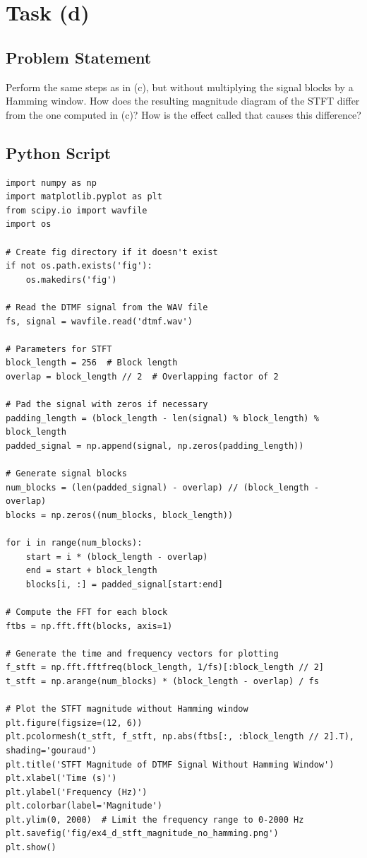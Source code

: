 \item[(d)]
\section*{Task (d)}

\subsection*{Problem Statement}
Perform the same steps as in (c), but without multiplying the signal blocks by a Hamming window. How does the resulting magnitude diagram of the STFT differ from the one computed in (c)? How is the effect called that causes this difference?

\subsection*{Python Script}
\begin{verbatim}
import numpy as np
import matplotlib.pyplot as plt
from scipy.io import wavfile
import os

# Create fig directory if it doesn't exist
if not os.path.exists('fig'):
    os.makedirs('fig')

# Read the DTMF signal from the WAV file
fs, signal = wavfile.read('dtmf.wav')

# Parameters for STFT
block_length = 256  # Block length
overlap = block_length // 2  # Overlapping factor of 2

# Pad the signal with zeros if necessary
padding_length = (block_length - len(signal) % block_length) % block_length
padded_signal = np.append(signal, np.zeros(padding_length))

# Generate signal blocks
num_blocks = (len(padded_signal) - overlap) // (block_length - overlap)
blocks = np.zeros((num_blocks, block_length))

for i in range(num_blocks):
    start = i * (block_length - overlap)
    end = start + block_length
    blocks[i, :] = padded_signal[start:end]

# Compute the FFT for each block
ftbs = np.fft.fft(blocks, axis=1)

# Generate the time and frequency vectors for plotting
f_stft = np.fft.fftfreq(block_length, 1/fs)[:block_length // 2]
t_stft = np.arange(num_blocks) * (block_length - overlap) / fs

# Plot the STFT magnitude without Hamming window
plt.figure(figsize=(12, 6))
plt.pcolormesh(t_stft, f_stft, np.abs(ftbs[:, :block_length // 2].T), shading='gouraud')
plt.title('STFT Magnitude of DTMF Signal Without Hamming Window')
plt.xlabel('Time (s)')
plt.ylabel('Frequency (Hz)')
plt.colorbar(label='Magnitude')
plt.ylim(0, 2000)  # Limit the frequency range to 0-2000 Hz
plt.savefig('fig/ex4_d_stft_magnitude_no_hamming.png')
plt.show()
\end{verbatim}

